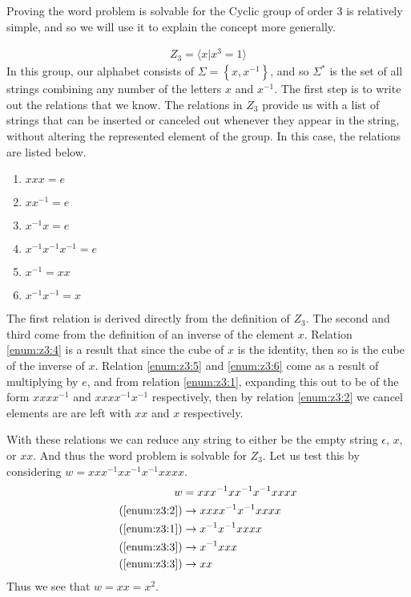 \documentclass[10pt]{amsart}
\theoremstyle{definition}
\theoremstyle{remark}
\begin{document}
Proving the word problem is solvable for the Cyclic group of order 3 is
relatively simple, and so we will use it to explain the concept more generally.

\begin{align}
  Z_3=\langle x \vert x^3=1 \rangle
\end{align}
In this group, our alphabet consists of $\Sigma=\left\{x,x^{-1}\right\}$, and
so $\Sigma^*$ is the set of all strings combining any number of the letters $x$
and $x^{-1}$. The first step is to write out the relations that we know. The
relations in $Z_3$ provide us with a list of strings that can be inserted or
canceled out whenever they appear in the string, without altering the
represented element of the group. In this case, the relations are listed below.
\begin{multicols}{2}
  \begin{enumerate}
    \item $xxx= e$\label{enum:z3:1}
    \item $xx^{-1}= e$\label{enum:z3:2}
    \item $x^{-1}x= e$\label{enum:z3:3}
    \item $x^{-1}x^{-1}x^{-1}= e$\label{enum:z3:4}
    \item $x^{-1}= xx$\label{enum:z3:5}
    \item $x^{-1}x^{-1}= x$\label{enum:z3:6}
  \end{enumerate}
\end{multicols}
The first relation is derived directly from the definition of $Z_3$. The second
and third come from the definition of an inverse of the element $x$. Relation
\ref{enum:z3:4} is a result that since the cube of $x$ is the identity, then so
is the cube of the inverse of $x$. Relation \ref{enum:z3:5} and \ref{enum:z3:6}
come as a result of multiplying by $e$, and from relation \ref{enum:z3:1},
expanding this out to be of the form $xxxx^{-1}$ and $xxxx^{-1}x^{-1}$
respectively, then by relation \ref{enum:z3:2} we cancel elements are are left
with $xx$ and $x$ respectively.

With these relations we can reduce any string to either be the empty string
$\epsilon$, $x$, or $xx$. And thus the word problem is solvable for $Z_3$. Let
us test this by considering $w=xxx^{-1}xx^{-1}x^{-1}xxxx$.
\begin{align*}
  w&=xxx^{-1}xx^{-1}x^{-1}xxxx\\
  (\ref{enum:z3:2})&\rightarrow xxxx^{-1}x^{-1}xxxx\\
  (\ref{enum:z3:1})&\rightarrow x^{-1}x^{-1}xxxx\\
  (\ref{enum:z3:3})&\rightarrow x^{-1}xxx\\
  (\ref{enum:z3:3})&\rightarrow xx\\
\end{align*}
Thus we see that $w=xx=x^2$.
\end{document}
